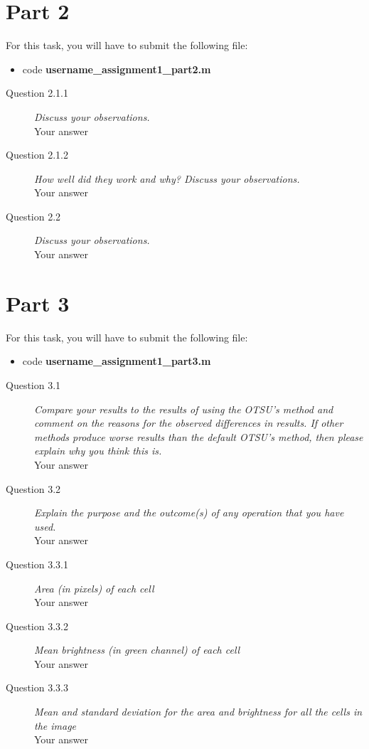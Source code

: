 \documentclass[a4paper, oneside]{article}
\begin{document}
	\section*{Part 2}
	For this task, you will have to submit the following file:
    \begin{itemize}
    \item code \textbf{username\_assignment1\_part2.m}
    \end{itemize}
\begin{description}
    \item [Question 2.1.1]
    \emph{Discuss your observations.}
    \\ Your answer
    \item [Question 2.1.2]
    \emph{How well did they work and why? Discuss your observations.}
    \\ Your answer
    \item [Question 2.2]
    \emph{Discuss your observations.}
    \\ Your answer    
\end{description}

	\section*{Part 3}
	For this task, you will have to submit the following file:
    \begin{itemize}
    \item code \textbf{username\_assignment1\_part3.m}
    \end{itemize}

	\begin{description}	
    \item[Question 3.1 ] \emph{Compare your results to the results of using the OTSU's method and
comment on the reasons for the observed differences in results. If other methods produce worse results than the default OTSU's method, then please explain why you think this is.} \\ Your answer
    \item[Question 3.2 ] \emph{Explain the purpose
and the outcome(s) of any operation that you have used.} \\ Your answer
    \item[Question 3.3.1] \emph{Area (in pixels) of each cell}
    \\ Your answer
    \item[Question 3.3.2] \emph{Mean brightness (in green channel) of each cell}
    \\ Your answer
    \item[Question 3.3.3] \emph{Mean and standard deviation for the area and brightness for all the cells in the image}    
    \\ Your answer
    
	\end{description}
	
\end{document}
